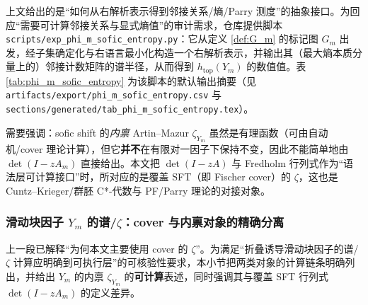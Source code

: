 \begin{remark}[可复现的邻接关系与熵计算（脚本）]\label{rem:phi_m_entropy_script}
上文给出的是“如何从右解析表示得到邻接关系/熵/Parry 测度”的抽象接口。为回应“需要可计算邻接关系与显式熵值”的审计需求，仓库提供脚本 \texttt{scripts/exp\_phi\_m\_sofic\_entropy.py}：它从定义 \ref{def:G_m} 的标记图 $G_m$ 出发，经子集确定化与右语言最小化构造一个右解析表示，并输出其（最大熵本质分量上的）邻接计数矩阵的谱半径，从而得到 $h_{\mathrm{top}}(Y_m)$ 的数值值。表 \ref{tab:phi_m_sofic_entropy} 为该脚本的默认输出摘要（见 \texttt{artifacts/export/phi\_m\_sofic\_entropy.csv} 与 \texttt{sections/generated/tab\_phi\_m\_sofic\_entropy.tex}）。
\end{remark}



\begin{remark}\label{rem:sofic-zeta-vs-cover}
需要强调：sofic shift 的\emph{内禀} Artin--Mazur \(\zeta_{Y_m}\) 虽然是有理函数（可由自动机/cover 理论计算），但它\textbf{并不}在有限对一因子下保持不变，因此不能简单地由 \(\det(I-zA_m)\) 直接给出。本文把 \(\det(I-zA)\) 与 Fredholm 行列式作为“语法层可计算接口”时，所对应的是覆盖 SFT（即 Fischer cover）的 \(\zeta\)，这也是 Cuntz--Krieger/群胚 C*-代数与 PF/Parry 理论的对接对象。
\end{remark}

\subsubsection{滑动块因子 \texorpdfstring{$Y_m$}{Ym} 的谱/\texorpdfstring{$\zeta$}{zeta}：cover 与内禀对象的精确分离}\label{subsec:Ym-zeta-spectrum}
上一段已解释“为何本文主要使用 cover 的 \(\zeta\)”。为满足“折叠诱导滑动块因子的谱/\(\zeta\) 计算应明确到可执行层”的可核验性要求，本小节把两类对象的计算链条明确列出，并给出 \(Y_m\) 的内禀 \(\zeta_{Y_m}\) 的\textbf{可计算}表述，同时强调其与覆盖 SFT 行列式 \(\det(I-zA_m)\) 的定义差异。

